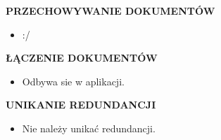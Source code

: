 \documentclass[a5paper,6pt]{article}
\begin{document}
    \textbf{PRZECHOWYWANIE DOKUMENTÓW}
    \begin{itemize}
        \item :/
    \end{itemize}

    \textbf{ŁĄCZENIE DOKUMENTÓW}
    \begin{itemize}
        \item Odbywa sie w aplikacji.
    \end{itemize}

    \textbf{UNIKANIE REDUNDANCJI}
    \begin{itemize}
        \item Nie należy unikać redundancji.
    \end{itemize}

\end{document}
